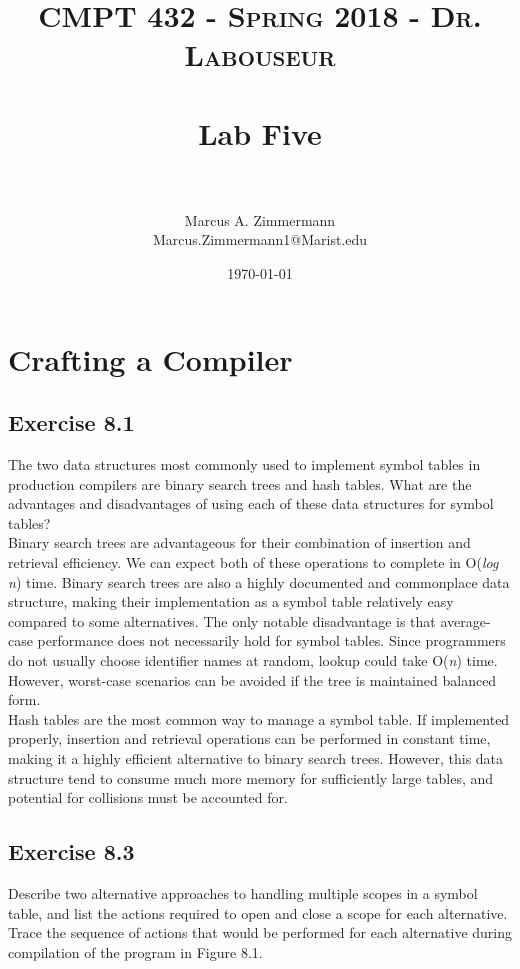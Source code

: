 \documentclass[letterpaper, 10pt,DIV=13]{scrartcl}
\title{	
   \normalfont \normalsize
   \textsc{CMPT 432 - Spring 2018 - Dr. Labouseur} \\[10pt] %
   \horrule{0.5pt} \\[0.25cm] 	%
   \huge Lab Five  \\     	    %
   \horrule{0.5pt} \\[0.25cm] 	%
}
\author{Marcus A. Zimmermann \\ \normalsize Marcus.Zimmermann1@Marist.edu}
\date{\normalsize\today} 	%
\numberwithin{equation}{section} %
\numberwithin{figure}{section} %
\numberwithin{table}{section} %
\begin{document}
\maketitle %

\section*{Crafting a Compiler}
\subsection*{Exercise 8.1}
The two data structures most commonly used to implement symbol tables in production compilers are binary search trees and hash tables. What are the advantages and disadvantages of using each of these data structures for symbol tables? \\

Binary search trees are advantageous for their combination of insertion and retrieval efficiency. We can expect both of these operations to complete in O(\textit{log n}) time. Binary search trees are also a highly documented and commonplace data structure, making their implementation as a symbol table relatively easy compared to some alternatives. The only notable disadvantage is that average-case performance does not necessarily hold for symbol tables. Since programmers do not usually choose identifier names at random, lookup could take O(\textit{n}) time. However, worst-case scenarios can be avoided if the tree is maintained balanced form.\\

Hash tables are the most common way to manage a symbol table. If implemented properly, insertion and retrieval operations can be performed in constant time, making it a highly efficient alternative to binary search trees. However, this data structure tend to consume much more memory for sufficiently large tables, and potential for collisions must be accounted for.

\pagebreak

\subsection*{Exercise 8.3}
Describe two alternative approaches to handling multiple scopes in a symbol table, and list the actions required to open and close a scope for each alternative. Trace the sequence of actions that would be performed for each alternative during compilation of the program in Figure 8.1.
\end{document}
